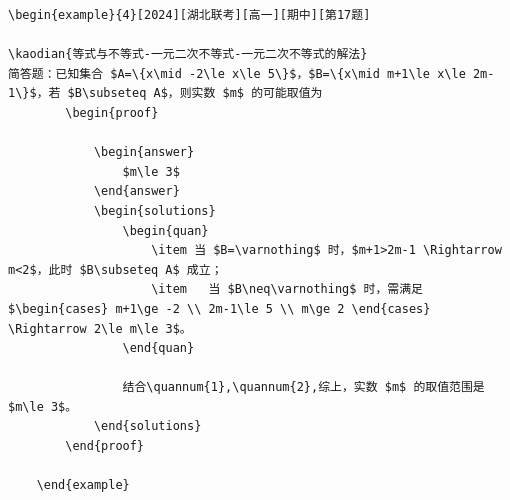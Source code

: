 \documentclass[
showanswers,             %
answercolor=red,      %
numbercolor=purple      %
]{biscuits}
\begin{document}
\begin{lstlisting}[style=mylatex, caption={ 写一道填空题}]
	\begin{example}{4}[2024][湖北联考][高一][期中][第17题]
		
\kaodian{等式与不等式-一元二次不等式-一元二次不等式的解法}
简答题：已知集合 $A=\{x\mid -2\le x\le 5\}$，$B=\{x\mid m+1\le x\le 2m-1\}$，若 $B\subseteq A$，则实数 $m$ 的可能取值为
		\begin{proof}
			
			\begin{answer}
				$m\le 3$
			\end{answer}
			\begin{solutions}
				\begin{quan}
					\item 当 $B=\varnothing$ 时，$m+1>2m-1 \Rightarrow m<2$，此时 $B\subseteq A$ 成立；
					\item 	当 $B\neq\varnothing$ 时，需满足 $\begin{cases} m+1\ge -2 \\ 2m-1\le 5 \\ m\ge 2 \end{cases} \Rightarrow 2\le m\le 3$。
				\end{quan}	
				
				结合\quannum{1},\quannum{2},综上，实数 $m$ 的取值范围是 $m\le 3$。
			\end{solutions}
		\end{proof}
		
	\end{example}
\end{lstlisting}		
\end{document}
